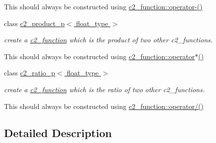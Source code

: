 \begin{DoxyCompactItemize}
\begin{DoxyCompactList}
This should always be constructed using \hyperlink{classc2__function_a4c56a4673e00bfad37143c403a0c94c8}{c2\-\_\-function\-::operator-\/()} \end{DoxyCompactList}\item 
class \hyperlink{classc2__product__p}{c2\-\_\-product\-\_\-p$<$ float\-\_\-type $>$}
\begin{DoxyCompactList}\small\item\em create a \hyperlink{classc2__function}{c2\-\_\-function} which is the product of two other c2\-\_\-functions.

This should always be constructed using \hyperlink{classc2__function_a7744675c98a8ec63320ac1c0b61bec9c}{c2\-\_\-function\-::operator$\ast$()} \end{DoxyCompactList}\item 
class \hyperlink{classc2__ratio__p}{c2\-\_\-ratio\-\_\-p$<$ float\-\_\-type $>$}
\begin{DoxyCompactList}\small\item\em create a \hyperlink{classc2__function}{c2\-\_\-function} which is the ratio of two other c2\-\_\-functions.

This should always be constructed using \hyperlink{classc2__function_a93ac28dfe5daebea84d147b8e346e60c}{c2\-\_\-function\-::operator/()} \end{DoxyCompactList}\end{DoxyCompactItemize}


\subsection{Detailed Description}
